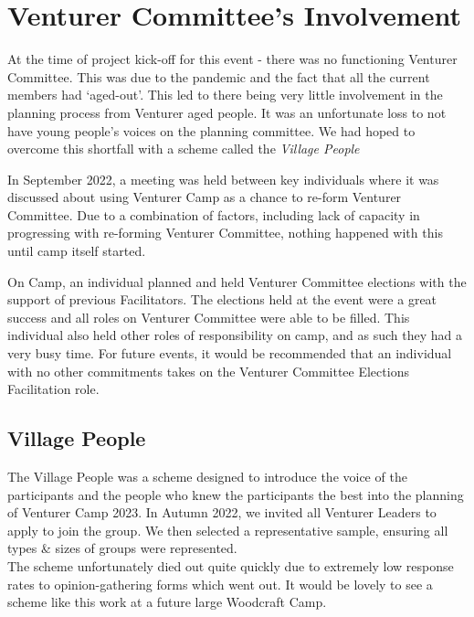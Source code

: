 \chapter{Venturer Committee's Involvement}
At the time of project kick-off for this event - there was no functioning Venturer Committee. This was due to the pandemic and the fact that all the current members had `aged-out'. This led to there being very little involvement in the planning process from Venturer aged people. It was an unfortunate loss to not have young people's voices on the planning committee. We had hoped to overcome this shortfall with a scheme called the \textit{Village People}

In September 2022, a meeting was held between key individuals where it was discussed about using Venturer Camp as a chance to re-form Venturer Committee. Due to a combination of factors, including lack of capacity in progressing with re-forming Venturer Committee, nothing happened with this until camp itself started.

On Camp, an individual planned and held Venturer Committee elections with the support of previous Facilitators. The elections held at the event were a great success and all roles on Venturer Committee were able to be filled. This individual also held other roles of responsibility on camp, and as such they had a very busy time. For future events, it would be recommended that an individual with no other commitments takes on the Venturer Committee Elections Facilitation role.

\section{Village People}
The Village People was a scheme designed to introduce the voice of the participants and the people who knew the participants the best into the planning of Venturer Camp 2023. In Autumn 2022, we invited all Venturer Leaders to apply to join the group. We then selected a representative sample, ensuring all types \& sizes of groups were represented.\\

The scheme unfortunately died out quite quickly due to extremely low response rates to opinion-gathering forms which went out. It would be lovely to see a scheme like this work at a future large Woodcraft Camp. 
